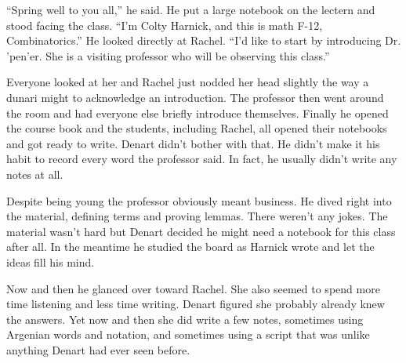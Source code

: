 ``Spring well to you all,'' he said. He put a large notebook on the lectern and stood facing the
class. ``I'm Colty Harnick, and this is math F-12, Combinatorics.'' He looked directly at
Rachel. ``I'd like to start by introducing Dr. 'pen'er. She is a visiting professor who will be
observing this class.''

Everyone looked at her and Rachel just nodded her head slightly the way a dunari might to
acknowledge an introduction. The professor then went around the room and had everyone else
briefly introduce themselves. Finally he opened the course book and the students, including
Rachel, all opened their notebooks and got ready to write. Denart didn't bother with that. He
didn't make it his habit to record every word the professor said. In fact, he usually didn't
write any notes at all.

Despite being young the professor obviously meant business. He dived right into the material,
defining terms and proving lemmas. There weren't any jokes. The material wasn't hard but Denart
decided he might need a notebook for this class after all. In the meantime he studied the board
as Harnick wrote and let the ideas fill his mind.

Now and then he glanced over toward Rachel. She also seemed to spend more time listening and
less time writing. Denart figured she probably already knew the answers. Yet now and then she
did write a few notes, sometimes using Argenian words and notation, and sometimes using a script
that was unlike anything Denart had ever seen before.


